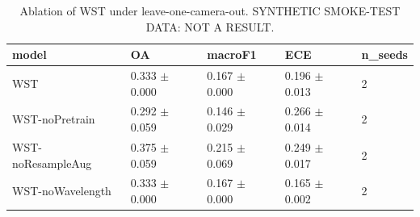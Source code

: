 \begin{table}[t]
\centering
\caption{Ablation of WST under leave-one-camera-out. SYNTHETIC SMOKE-TEST DATA: NOT A RESULT.}
\label{tab:table_ablation}
\begin{tabular}{lllll}
\hline
model & OA & macroF1 & ECE & n\_seeds \\
\hline
WST & 0.333 $\pm$ 0.000 & 0.167 $\pm$ 0.000 & 0.196 $\pm$ 0.013 & 2 \\
WST-noPretrain & 0.292 $\pm$ 0.059 & 0.146 $\pm$ 0.029 & 0.266 $\pm$ 0.014 & 2 \\
WST-noResampleAug & 0.375 $\pm$ 0.059 & 0.215 $\pm$ 0.069 & 0.249 $\pm$ 0.017 & 2 \\
WST-noWavelength & 0.333 $\pm$ 0.000 & 0.167 $\pm$ 0.000 & 0.165 $\pm$ 0.002 & 2 \\
\hline
\end{tabular}
\end{table}